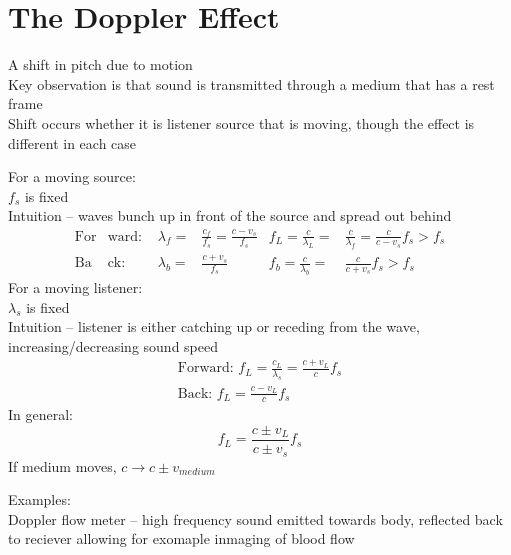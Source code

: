 \documentclass[a4paper, 11pt, fleqn, normalem]{report}
\begin{document}
\section{The Doppler Effect}
A shift in pitch due to motion \\
Key observation is that sound is transmitted through a medium that has a rest frame \\
Shift occurs whether it is listener source that is moving, though the effect is different in each case

For a moving source: \\
$f_{s}$ is fixed \\
Intuition -- waves bunch up in front of the source and spread out behind
\begin{align*}
    \text{For}&\text{ward: } & \lambda_{f} =& \frac{c_{f}}{f_{s}} = \frac{c - v_{s}}{f_{s}} & f_{L} = \frac{c}{\lambda_{L}} =& \frac{c}{\lambda_{f}} = \frac{c}{c - v_{s}}f_{s} > f_{s} \\
    \text{Ba}&\text{ck: } & \lambda_{b} =& \frac{c + v_{s}}{f_{s}} & f_{b} = \frac{c}{\lambda_{b}} =& \frac{c}{c + v_{s}}f_{s} > f_{s}
\end{align*}
For a moving listener: \\
$\lambda_{s}$ is fixed \\
Intuition -- listener is either catching up or receding from the wave, increasing/decreasing sound speed
\begin{gather*}
    \text{Forward: } f_{L} = \frac{c_{L}}{\lambda_{s}} = \frac{c + v_{L}}{c}f_{s} \\
    \text{Back: } f_{L} = \frac{c - v_{L}}{c}f_{s}
\end{gather*}
In general:
\begin{equation*}
    f_{L} = \frac{c \pm v_{L}}{c \pm v_{s}}f_{s}
\end{equation*}
If medium moves, $c \rightarrow c \pm v_{medium}$

Examples: \\
Doppler flow meter -- high frequency sound emitted towards body, reflected back to reciever allowing for exomaple inmaging of blood flow
\end{document}
